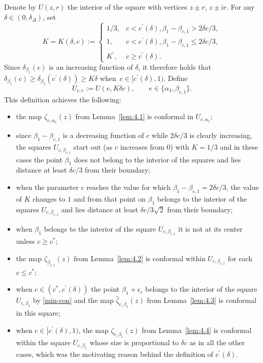 \documentclass[pdftex]{sigma}
\numberwithin{equation}{section}
\newcommand{\ic}{\mathrm{i}}
\begin{document}
Denote by $ U(z,r) $ the interior of the square with vertices $ z\pm r$, $z\pm\ic r $. For any $ \delta\in(0,\delta_\Delta) $, set
\begin{equation}
\label{Kdeltac}
K = K(\delta,c) := \begin{cases}
1/3, & c<c^\prime(\delta), \beta_1-\beta_{c,1}>2\delta c/3, \\
1, & c<c^\prime(\delta), \beta_1-\beta_{c,1} \leq 2\delta c/3, \\
K^\prime, & c\geq c^\prime(\delta).
\end{cases}
\end{equation}
Since $ \delta_{\beta_1}(c) $ is an increasing function of $ \delta $, it therefore holds that $ \delta_{\beta_1}(c) \geq \delta_{\beta_1}(c^\prime(\delta)) \geq K\delta $ when~$ c \in [c^\prime(\delta),1) $. Define
\begin{equation}
\label{Uc1}
U_{c,e} := U(e,K\delta c), \qquad e\in \{\alpha_1,\beta_{c,1} \}.
\end{equation}
This definition achieves the following:
\begin{itemize}\itemsep=0pt
\item the map $ \zeta_{c,\alpha_1}(z) $ from Lemma~\ref{lem:4.1} is conformal in $ U_{c,\alpha_1} $;
\item since $ \beta_1-\beta_{c,1} $ is a decreasing function of $ c $ while $ 2\delta c/3 $ is clearly increasing, the squares $ U_{c,\beta_{c,1}} $ start out (as $ c $ increases from $0$) with $ K = 1/3 $ and in these cases the point $ \beta_1 $ does not belong to the interior of the squares and lies distance at least $ \delta c/3 $ from their boundary;
\item when the parameter $ c $ reaches the value for which $ \beta_1-\beta_{c,1}=2\delta c/3 $, the value of $ K $ changes to $ 1 $ and from that point on $ \beta_1 $ belongs to the interior of the squares $ U_{c,\beta_{c,1}} $ and lies distance at least $ \delta c/3\sqrt2 $ from their boundary;
\item when $ \beta_1 $ belongs to the interior of the square $ U_{c,\beta_{c,1}} $ it is not at its center unless $ c\geq c^* $;
\item the map $ \zeta_{\beta_{c,1}}(z) $ from Lemma~\ref{lem:4.2} is conformal within $ U_{c,\beta_{c,1}} $ for each $ c\leq c^* $;
\item when $ c\in(c^*,c^\prime(\delta)) $ the point $ \beta_1+\epsilon_c $ belongs to the interior of the square $ U_{c,\beta_1} $ by \eqref{min-con} and the map $ \hat\zeta_{c,\beta_1}(z) $ from Lemma~\ref{lem:4.3} is conformal in this square;
\item when $ c\in[c^\prime(\delta),1) $, the map $ \zeta_{c,\beta_1}(z) $ from Lemma~\ref{lem:4.4} is conformal within the square $ U_{c,\beta_1} $ whose size is proportional to $ \delta c $ as in all the other cases, which was the motivating reason behind the definition of $ c^\prime(\delta) $.
\end{itemize}
\end{document}
